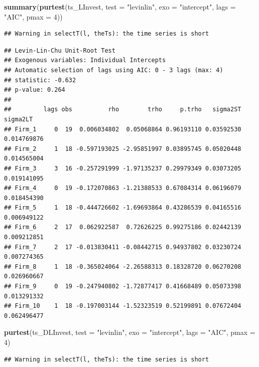\documentclass[
]{book}
\newenvironment{Shaded}{\begin{snugshade}}{\end{snugshade}}
\newcommand{\AttributeTok}[1]{\textcolor[rgb]{0.13,0.29,0.53}{#1}}
\newcommand{\DecValTok}[1]{\textcolor[rgb]{0.00,0.00,0.81}{#1}}
\newcommand{\FunctionTok}[1]{\textcolor[rgb]{0.13,0.29,0.53}{\textbf{#1}}}
\newcommand{\NormalTok}[1]{#1}
\newcommand{\StringTok}[1]{\textcolor[rgb]{0.31,0.60,0.02}{#1}}
\begin{document}
\begin{Shaded}
\begin{Highlighting}[]
\FunctionTok{summary}\NormalTok{(}\FunctionTok{purtest}\NormalTok{(ts\_LInvest, }\AttributeTok{test =} \StringTok{"levinlin"}\NormalTok{, }\AttributeTok{exo =} \StringTok{"intercept"}\NormalTok{, }
        \AttributeTok{lags =} \StringTok{"AIC"}\NormalTok{, }\AttributeTok{pmax =} \DecValTok{4}\NormalTok{))}
\end{Highlighting}
\end{Shaded}

\begin{verbatim}
## Warning in selectT(l, theTs): the time series is short
\end{verbatim}

\begin{verbatim}
## Levin-Lin-Chu Unit-Root Test 
## Exogenous variables: Individual Intercepts 
## Automatic selection of lags using AIC: 0 - 3 lags (max: 4)
## statistic: -0.632 
## p-value: 0.264 
## 
##         lags obs          rho        trho     p.trho   sigma2ST    sigma2LT
## Firm_1     0  19  0.006034802  0.05068864 0.96193110 0.03592530 0.014769876
## Firm_2     1  18 -0.597193025 -2.95851997 0.03895745 0.05020448 0.014565004
## Firm_3     3  16 -0.257291999 -1.97135237 0.29979349 0.03073205 0.019141095
## Firm_4     0  19 -0.172070863 -1.21388533 0.67084314 0.06196079 0.018454390
## Firm_5     1  18 -0.444726602 -1.69693864 0.43286539 0.04165516 0.006949122
## Firm_6     2  17  0.062922587  0.72626225 0.99275186 0.02442139 0.009212851
## Firm_7     2  17 -0.013830411 -0.08442715 0.94937802 0.03230724 0.007274365
## Firm_8     1  18 -0.365024064 -2.26588313 0.18328720 0.06270208 0.026960667
## Firm_9     0  19 -0.247940802 -1.72877417 0.41668489 0.05073398 0.013291332
## Firm_10    1  18 -0.197003144 -1.52323519 0.52199891 0.07672404 0.062496477
\end{verbatim}

\begin{Shaded}
\begin{Highlighting}[]
\FunctionTok{purtest}\NormalTok{(ts\_DLInvest, }\AttributeTok{test =} \StringTok{"levinlin"}\NormalTok{, }\AttributeTok{exo =} \StringTok{"intercept"}\NormalTok{, }
        \AttributeTok{lags =} \StringTok{"AIC"}\NormalTok{, }\AttributeTok{pmax =} \DecValTok{4}\NormalTok{)}
\end{Highlighting}
\end{Shaded}

\begin{verbatim}
## Warning in selectT(l, theTs): the time series is short
\end{verbatim}
\end{document}
